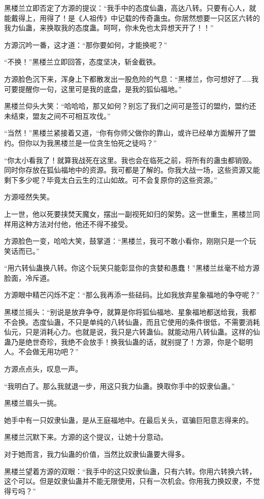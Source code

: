 \begin{this_body}
黑楼兰立即否定了方源的提议：“我手中的态度仙蛊，高达八转。只要有心人，就能戴得上，用得了！是《人祖传》中记载的传奇蛊虫。你居然想要一只区区六转的我力仙蛊，来换取我的态度蛊。呵呵，你未免也太异想天开了！！”

方源沉吟一番，这才道：“那你要如何，才能换呢？”

“不换！”黑楼兰立即回答，态度坚决，斩金截铁。

方源脸色沉下来，浑身上下都散发出一股危险的气息：“黑楼兰，你可想好了……我可要提醒你一句，这里可是我的底盘，是我的狐仙福地。”

黑楼兰仰头大笑：“哈哈哈，那又如何？别忘了我们之间可是签订的盟约，盟约还未结束，盟友之间不可相互攻伐。”

“当然！”黑楼兰紧接着又道，“你有你师父做你的靠山，或许已经单方面解开了盟约。但你以为我黑楼兰是一位贪生怕死之徒吗？”

“你太小看我了！就算我战死在这里。我也会在临死之前，将所有的蛊虫都销毁。同时你存放在狐仙福地中的资源。我可都是了解的。你我大战一场，这些资源又能剩下多少呢？毕竟太白云生的江山如故。可不会复原你的这些资源。”

方源哑然失笑。

上一世，他以死要挟焚天魔女，摆出一副视死如归的架势。这一世重生，黑楼兰同样用这种方法对付他，他还不得不接受。

方源脸色一变，哈哈大笑，鼓掌道：“黑楼兰，我可不敢小看你，刚刚只是一个玩笑话而已。”

“用六转仙蛊换八转。你这个玩笑只能彰显你的贪婪和愚蠢！”黑楼兰丝毫不给方源脸面，冷斥道。

方源眼中精芒闪烁不定：“那么我再添一些砝码。比如我放弃星象福地的争夺呢？”

黑楼兰摇头：“别说是放弃争夺，就算是你将狐仙福地、星象福地都送给我，我都不会换。态度仙蛊，不只是单纯的八转仙蛊，而且它使用的条件很低，不需要消耗仙元，只是消耗心力。也就是说，我只是六转蛊仙。就能动用八转仙蛊。这样的仙蛊乃是绝世奇珍，我绝不会放手！换我仙蛊的话，就别提了！方源，你是个聪明人。不会做无用功吧？”

方源点点头，叹息一声。

“我明白了。那么我就退一步，用这只我力仙蛊。换取你手中的奴隶仙蛊。”

黑楼兰眉头一挑。

她手中有一只奴隶仙蛊，是从王庭福地中。在最后关头，诓骗巨阳意志得来的。

黑楼兰沉默下来。方源的这个提议，让她十分意动。

对于她而言，我力仙蛊的价值，当然比奴隶仙蛊要大得多。

黑楼兰望着方源的双眼：“我手中的这只奴隶仙蛊，只有六转。你用六转换六转，这个可以。但是奴隶仙蛊并不能无限使用，只有一次机会。你用我力换奴隶，不觉得亏吗？”


\end{this_body}
